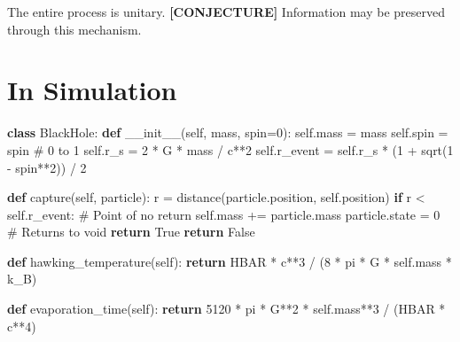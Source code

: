 \documentclass[
  11pt,
  letterpaper,
  twoside,
  openright]{book}
\newenvironment{Shaded}{\begin{snugshade}}{\end{snugshade}}
\newcommand{\CommentTok}[1]{\textcolor[rgb]{0.37,0.37,0.37}{#1}}
\newcommand{\ControlFlowTok}[1]{\textcolor[rgb]{0.00,0.23,0.31}{\textbf{#1}}}
\newcommand{\DecValTok}[1]{\textcolor[rgb]{0.68,0.00,0.00}{#1}}
\newcommand{\FunctionTok}[1]{\textcolor[rgb]{0.28,0.35,0.67}{#1}}
\newcommand{\KeywordTok}[1]{\textcolor[rgb]{0.00,0.23,0.31}{\textbf{#1}}}
\newcommand{\NormalTok}[1]{\textcolor[rgb]{0.00,0.23,0.31}{#1}}
\newcommand{\OperatorTok}[1]{\textcolor[rgb]{0.37,0.37,0.37}{#1}}
\newcommand{\VariableTok}[1]{\textcolor[rgb]{0.07,0.07,0.07}{#1}}
\begin{document}
The entire process is unitary. \textbf{{[}CONJECTURE{]}} Information may
be preserved through this mechanism.

\section{In Simulation}\label{in-simulation-22}

\begin{Shaded}
\begin{Highlighting}[]
\KeywordTok{class}\NormalTok{ BlackHole:}
    \KeywordTok{def} \FunctionTok{\_\_init\_\_}\NormalTok{(}\VariableTok{self}\NormalTok{, mass, spin}\OperatorTok{=}\DecValTok{0}\NormalTok{):}
        \VariableTok{self}\NormalTok{.mass }\OperatorTok{=}\NormalTok{ mass}
        \VariableTok{self}\NormalTok{.spin }\OperatorTok{=}\NormalTok{ spin  }\CommentTok{\# 0 to 1}
        \VariableTok{self}\NormalTok{.r\_s }\OperatorTok{=} \DecValTok{2} \OperatorTok{*}\NormalTok{ G }\OperatorTok{*}\NormalTok{ mass }\OperatorTok{/}\NormalTok{ c}\OperatorTok{**}\DecValTok{2}
        \VariableTok{self}\NormalTok{.r\_event }\OperatorTok{=} \VariableTok{self}\NormalTok{.r\_s }\OperatorTok{*}\NormalTok{ (}\DecValTok{1} \OperatorTok{+}\NormalTok{ sqrt(}\DecValTok{1} \OperatorTok{{-}}\NormalTok{ spin}\OperatorTok{**}\DecValTok{2}\NormalTok{)) }\OperatorTok{/} \DecValTok{2}

    \KeywordTok{def}\NormalTok{ capture(}\VariableTok{self}\NormalTok{, particle):}
\NormalTok{        r }\OperatorTok{=}\NormalTok{ distance(particle.position, }\VariableTok{self}\NormalTok{.position)}
        \ControlFlowTok{if}\NormalTok{ r }\OperatorTok{\textless{}} \VariableTok{self}\NormalTok{.r\_event:}
            \CommentTok{\# Point of no return}
            \VariableTok{self}\NormalTok{.mass }\OperatorTok{+=}\NormalTok{ particle.mass}
\NormalTok{            particle.state }\OperatorTok{=} \DecValTok{0}  \CommentTok{\# Returns to void}
            \ControlFlowTok{return} \VariableTok{True}
        \ControlFlowTok{return} \VariableTok{False}

    \KeywordTok{def}\NormalTok{ hawking\_temperature(}\VariableTok{self}\NormalTok{):}
        \ControlFlowTok{return}\NormalTok{ HBAR }\OperatorTok{*}\NormalTok{ c}\OperatorTok{**}\DecValTok{3} \OperatorTok{/}\NormalTok{ (}\DecValTok{8} \OperatorTok{*}\NormalTok{ pi }\OperatorTok{*}\NormalTok{ G }\OperatorTok{*} \VariableTok{self}\NormalTok{.mass }\OperatorTok{*}\NormalTok{ k\_B)}

    \KeywordTok{def}\NormalTok{ evaporation\_time(}\VariableTok{self}\NormalTok{):}
        \ControlFlowTok{return} \DecValTok{5120} \OperatorTok{*}\NormalTok{ pi }\OperatorTok{*}\NormalTok{ G}\OperatorTok{**}\DecValTok{2} \OperatorTok{*} \VariableTok{self}\NormalTok{.mass}\OperatorTok{**}\DecValTok{3} \OperatorTok{/}\NormalTok{ (HBAR }\OperatorTok{*}\NormalTok{ c}\OperatorTok{**}\DecValTok{4}\NormalTok{)}
\end{Highlighting}
\end{Shaded}
\end{document}
